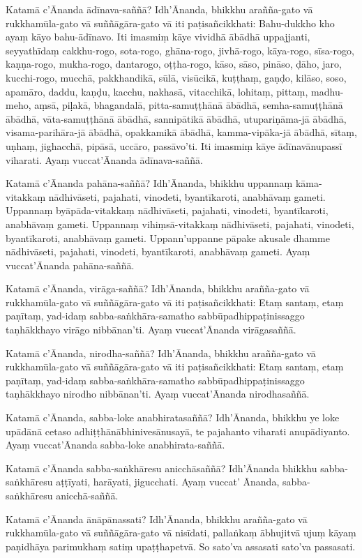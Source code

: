 Katamā c’Ānanda ādīnava-saññā? Idh’Ānanda, bhikkhu arañña-gato vā
rukkhamūla-gato vā suññāgāra-gato vā iti paṭisañcikkhati: Bahu-dukkho kho ayaṃ
kāyo bahu-ādīnavo. Iti imasmiṃ kāye vividhā ābādhā uppajjanti, seyyathīdaṃ
cakkhu-rogo, sota-rogo, ghāna-rogo, jivhā-rogo, kāya-rogo, sīsa-rogo,
kaṇṇa-rogo, mukha-rogo, dantarogo, oṭṭha-rogo, kāso, sāso, pināso, ḍāho, jaro,
kucchi-rogo, mucchā, pakkhandikā, sūlā, visūcikā, kuṭṭhaṃ, gaṇḍo, kilāso, soso,
apamāro, daddu, kaṇḍu, kacchu, nakhasā, vitacchikā, lohitaṃ, pittaṃ, madhu-meho,
aṃsā, piḷakā, bhagandalā, pitta-samuṭṭhānā ābādhā, semha-samuṭṭhānā ābādhā,
vāta-samuṭṭhānā ābādhā, sannipātikā ābādhā, utupariṇāma-jā ābādhā,
visama-parihāra-jā ābādhā, opakkamikā ābādhā, kamma-vipāka-jā ābādhā, sītaṃ,
uṇhaṃ, jighacchā, pipāsā, uccāro, passāvo’ti. Iti imasmiṃ kāye ādīnavānupassī
viharati. Ayaṃ vuccat’Ānanda ādīnava-saññā.

Katamā c’Ānanda pahāna-saññā? Idh’Ānanda, bhikkhu uppannaṃ kāma-vitakkaṃ
nādhivāseti, pajahati, vinodeti, byantīkaroti, anabhāvaṃ gameti. Uppannaṃ
byāpāda-vitakkaṃ nādhivāseti, pajahati, vinodeti, byantīkaroti, anabhāvaṃ
gameti. Uppannaṃ vihiṃsā-vitakkaṃ nādhivāseti, pajahati, vinodeti, byantīkaroti,
anabhāvaṃ gameti. Uppann’uppanne pāpake akusale dhamme nādhivāseti, pajahati,
vinodeti, byantīkaroti, anabhāvaṃ gameti. Ayaṃ vuccat’Ānanda pahāna-saññā.

Katamā c’Ānanda, virāga-saññā? Idh’Ānanda, bhikkhu arañña-gato vā
rukkhamūla-gato vā suññāgāra-gato vā iti paṭisañcikkhati: Etaṃ santaṃ, etaṃ
paṇītaṃ, yad-idaṃ sabba-saṅkhāra-samatho sabbūpadhippaṭinissaggo taṇhākkhayo
virāgo nibbānan’ti. Ayaṃ vuccat’Ānanda virāgasaññā.

Katamā c’Ānanda, nirodha-saññā? Idh’Ānanda, bhikkhu arañña-gato vā
rukkhamūla-gato vā suññāgāra-gato vā iti paṭisañcikkhati: Etaṃ santaṃ, etaṃ
paṇītaṃ, yad-idaṃ sabba-saṅkhāra-samatho sabbūpadhippaṭinissaggo taṇhākkhayo
nirodho nibbānan’ti. Ayaṃ vuccat’Ānanda nirodhasaññā.

Katamā c’Ānanda, sabba-loke anabhiratasaññā? Idh’Ānanda, bhikkhu ye loke
upādānā cetaso adhiṭṭhānābhinivesānusayā, te pajahanto viharati anupādiyanto.
Ayaṃ vuccat’Ānanda sabba-loke anabhirata-saññā.

Katamā c’Ānanda sabba-saṅkhāresu anicchāsaññā? Idh’Ānanda bhikkhu
sabba-saṅkhāresu aṭṭīyati, harāyati, jigucchati. Ayaṃ vuccat’ Ānanda,
sabba-saṅkhāresu anicchā-saññā.

Katamā c’Ānanda ānāpānassati?
Idh’Ānanda, bhikkhu arañña-gato vā rukkhamūla-gato vā suññāgāra-gato vā nisīdati,
pallaṅkaṃ ābhujitvā ujuṃ kāyaṃ paṇidhāya parimukhaṃ satiṃ upaṭṭhapetvā. So sato’va
assasati sato’va passasati.


